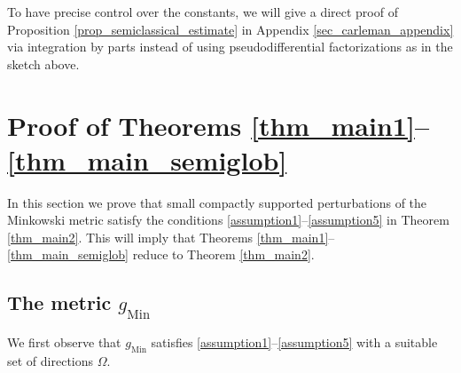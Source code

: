 \documentclass[11pt,letterpaper]{amsart}
\theoremstyle{definition}
\numberwithin{equation}{section}
\newcommand{\gm}{g_{\mathrm{Min}}}
\begin{document}
To have precise control over the constants, we will give a direct proof of Proposition \ref{prop_semiclassical_estimate} in Appendix \ref{sec_carleman_appendix} via integration by parts instead of using pseudodifferential factorizations as in the sketch above.





\section{Proof of Theorems \ref{thm_main1}--\ref{thm_main_semiglob}}
\label{sec_proof_of_main_ths}

In this section we prove that small compactly supported perturbations of the Minkowski metric satisfy the conditions \eqref{assumption1}--\eqref{assumption5} in Theorem \ref{thm_main2}. This will imply that Theorems \ref{thm_main1}--\ref{thm_main_semiglob} reduce to Theorem \ref{thm_main2}.

\subsection{The metric \texorpdfstring{$\gm$}{gMin}}

We first observe that $\gm$ satisfies \eqref{assumption1}--\eqref{assumption5} with a suitable set of directions $\Omega$.
\end{document}
